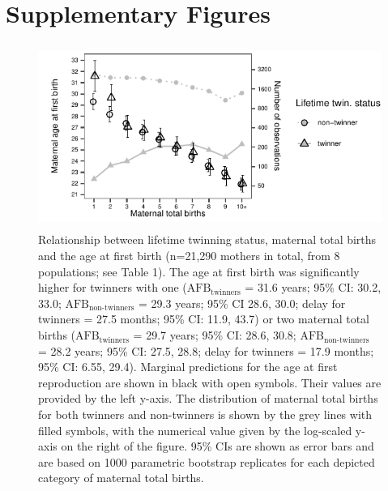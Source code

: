 \documentclass[a4paper]{article}\usepackage[]{graphicx}\usepackage[]{color}
\begin{document}
\pagebreak


\section{Supplementary Figures}

\begin{figure}[H]
\begin{center}
\includegraphics[height = 6cm]{../figures/figS1.pdf}
\end{center}
\caption{Relationship between lifetime twinning status, maternal total births and the age at first birth (n=21,290 mothers in total, from 8 populations; see Table 1). The age at first birth was significantly higher for twinners with one ($\textrm{AFB}_\textrm{twinners}$ = 31.6 years; 95\% CI: 30.2, 33.0; $\textrm{AFB}_\textrm{non-twinners}$ = 29.3 years; 95\% CI 28.6, 30.0; delay for twinners = 27.5 months; 95\% CI: 11.9, 43.7) or two maternal total births ($\textrm{AFB}_\textrm{twinners}$ = 29.7 years; 95\% CI: 28.6, 30.8; $\textrm{AFB}_\textrm{non-twinners}$ = 28.2 years; 95\% CI: 27.5, 28.8; delay for twinners = 17.9 months; 95\% CI: 6.55, 29.4). Marginal predictions for the age at first reproduction are shown in black with open symbols. Their values are provided by the left y-axis. The distribution of maternal total births for both twinners and non-twinners is shown by the grey lines with filled symbols, with the numerical value given by the log-scaled y-axis on the right of the figure. 95\% CIs are shown as error bars and are based on 1000 parametric bootstrap replicates for each depicted category of maternal total births.}
\end{figure}
\end{document}
